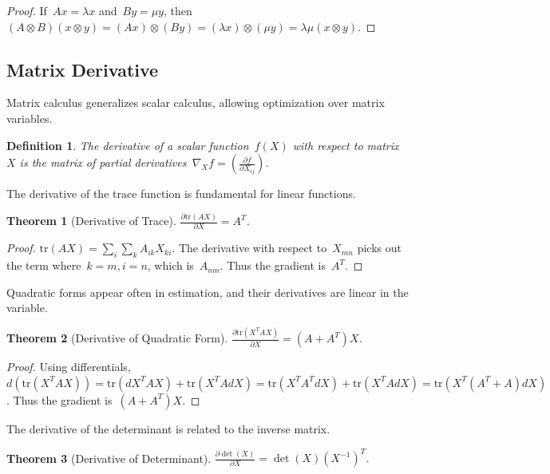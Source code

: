 \documentclass[12pt]{article}
\newtheorem{theorem}{Theorem}[section]
\newtheorem{definition}{Definition}[section]
\begin{document}
\begin{proof}
    If~$Ax = \lambda x$ and~$By = \mu y$, then~$(A \otimes B)(x \otimes y) = (Ax) \otimes (By) = (\lambda x) \otimes (\mu y) = \lambda \mu (x \otimes y)$.
\end{proof}

\subsection{Matrix Derivative}

Matrix calculus generalizes scalar calculus, allowing optimization over matrix variables.

\begin{definition}
    The derivative of a scalar function~$f(X)$ with respect to matrix~$X$ is the matrix of partial derivatives~$\nabla_X f = \left( \frac{\partial f}{\partial X_{ij}} \right)$.
\end{definition}

The derivative of the trace function is fundamental for linear functions.

\begin{theorem}[Derivative of Trace]
    $\frac{\partial \text{tr}(AX)}{\partial X} = A^T$.
\end{theorem}

\begin{proof}
    $\text{tr}(AX) = \sum_i \sum_k A_{ik} X_{ki}$. The derivative with respect to~$X_{mn}$ picks out the term where~$k=m, i=n$, which is~$A_{nm}$. Thus the gradient is~$A^T$.
\end{proof}

Quadratic forms appear often in estimation, and their derivatives are linear in the variable.

\begin{theorem}[Derivative of Quadratic Form]
    $\frac{\partial \text{tr}(X^T A X)}{\partial X} = (A + A^T)X$.
\end{theorem}

\begin{proof}
    Using differentials,~$d(\text{tr}(X^T A X)) = \text{tr}(dX^T A X) + \text{tr}(X^T A dX) = \text{tr}(X^T A^T dX) + \text{tr}(X^T A dX) = \text{tr}(X^T(A^T + A)dX)$. Thus the gradient is~$(A + A^T)X$.
\end{proof}

The derivative of the determinant is related to the inverse matrix.

\begin{theorem}[Derivative of Determinant]
    $\frac{\partial \det(X)}{\partial X} = \det(X) (X^{-1})^T$.
\end{theorem}
\end{document}
